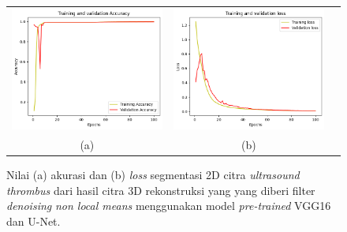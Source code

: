 \begin{enumerate}
	
	\begin{figure}[htbp]
		\centering
		\begin{tabular}{ccc}
			\includegraphics[scale=0.5]{bab4/Rekap Training/VGG16-UNet/nlm/3/acc_99,69685673713684.png} &
			\includegraphics[scale=0.5]{bab4/Rekap Training/VGG16-UNet/nlm/3/loss_0,0106.png} & \\
			(a) & (b)    %
		\end{tabular}
		\caption{Nilai (a) akurasi dan (b) \textit{loss} segmentasi 2D citra \textit{ultrasound} \textit{thrombus} dari hasil citra 3D rekonstruksi yang yang diberi filter \textit{denoising} \textit{non local means} menggunakan model \textit{pre-trained} VGG16 dan U-Net.}
		\label{fig:performance-nlm-vggunet-rekonstruksi}
	\end{figure}
\end{enumerate}


